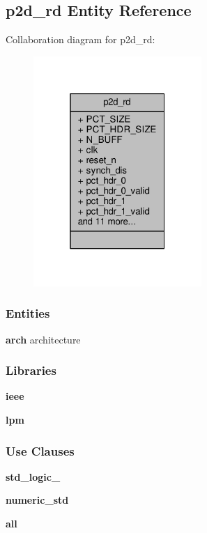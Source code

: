 \subsection{p2d\+\_\+rd Entity Reference}
\label{classp2d__rd}


Collaboration diagram for p2d\+\_\+rd\+:\nopagebreak
\begin{figure}[H]
\begin{center}
\leavevmode
\includegraphics[width=181pt]{dd/d2b/classp2d__rd__coll__graph}
\end{center}
\end{figure}
\subsubsection*{Entities}
\begin{DoxyCompactItemize}
\item 
{\bf arch} architecture
\end{DoxyCompactItemize}
\subsubsection*{Libraries}
 \begin{DoxyCompactItemize}
\item 
{\bf ieee} 
\item 
{\bf lpm} 
\end{DoxyCompactItemize}
\subsubsection*{Use Clauses}
 \begin{DoxyCompactItemize}
\item 
{\bf std\+\_\+logic\+\_}   
\item 
{\bf numeric\+\_\+std}   
\item 
{\bf  all }   
\end{DoxyCompactItemize}
